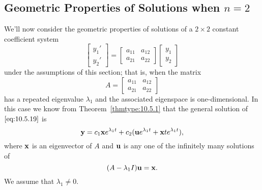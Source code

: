 \documentclass{ximera}
\begin{document}
\subsection*{Geometric Properties of Solutions when  $n=2$}
We'll now  consider the geometric properties of solutions of a
$2\times 2$ constant coefficient system
\begin{equation} \label{eq:10.5.19}
\begin{bmatrix}y_1'\\y_2'\end{bmatrix}=\begin{bmatrix}a_{11}&a_{12}\\a_{21}&a_{22}
\end{bmatrix}\begin{bmatrix}y_1\\y_2\end{bmatrix}
\end{equation}
under the assumptions of this section; that is, when the matrix
$$
A=\begin{bmatrix}a_{11}&a_{12}\\a_{21}&a_{22}
\end{bmatrix}
$$
has a repeated eigenvalue $\lambda_1$ and the associated eigenspace is
one-dimensional. In this case we know from Theorem~\ref{thmtype:10.5.1}
that the general solution of $\eqref{eq:10.5.19}$ is
\begin{equation} \label{eq:10.5.20}
{\bf y}=c_1{\bf x}e^{\lambda_1t}+c_2({\bf u}e^{\lambda_1t}+{\bf
x}te^{\lambda_1t}),
\end{equation}
where ${\bf x}$ is an eigenvector of $A$ and ${\bf u}$ is any one of
the infinitely many solutions of
\begin{equation} \label{eq:10.5.21}
(A-\lambda_1I){\bf u}={\bf x}.
\end{equation}
We assume that $\lambda_1\neq0$.

\begin{center}
\end{center}
\end{document}

